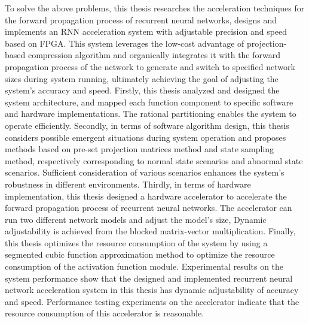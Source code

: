 \begin{englishabstract}
To solve the above problems, this thesis researches the acceleration techniques for the forward propagation process of recurrent neural networks, 
designs and implements an RNN acceleration system with adjustable precision and 
speed based on FPGA. 
This system leverages the low-cost advantage of projection-based compression algorithm and organically integrates it with 
the forward propagation process of the network to generate and switch to specified network sizes during system running,
ultimately achieving the goal of adjusting the system's accuracy and speed. 
Firstly, this thesis analyzed and designed the system architecture, and mapped each function component to specific software 
and hardware implementations. The rational partitioning enables the system to operate efficiently.
Secondly, in terms of software algorithm design, this thesis considers possible emergent situations during system operation 
and proposes methods based on pre-set projection matrices method and state sampling method, respectively corresponding to 
normal state scenarios and abnormal state scenarios. 
Sufficient consideration of various scenarios enhances the system's robustness in different environments.
Thirdly, in terms of hardware implementation, this thesis designed a hardware accelerator to accelerate the forward propagation 
process of recurrent neural networks. The accelerator can run two different network models and adjust the model's size, 
Dynamic adjustability is achieved from the blocked matrix-vector multiplication.
Finally, this thesis optimizes the resource consumption of the system by using a segmented cubic function approximation method to 
optimize the resource consumption of the activation function module.
Experimental results on the system performance show that the designed and implemented recurrent neural network acceleration system 
in this thesis has dynamic adjustability of accuracy and speed. Performance testing experiments on the accelerator indicate that
the resource consumption of this accelerator is reasonable.

\end{englishabstract}
